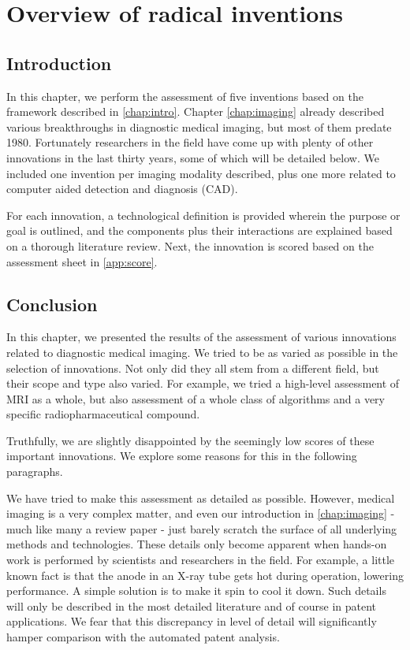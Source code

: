 \chapter{Overview of radical inventions}\label{chap:inventions}

\section{Introduction}
In this chapter, we perform the assessment of five inventions based on the
framework described in \autoref{chap:intro}. Chapter \ref{chap:imaging}
already described various breakthroughs in diagnostic medical imaging, but most of them
predate 1980. Fortunately researchers in the field have come up with plenty of
other innovations in the last thirty years, some of which will be detailed
below. We included one invention per imaging modality described, plus one more
related to computer aided detection and diagnosis (CAD).

For each innovation, a technological definition is provided wherein the purpose
or goal is outlined, and the components plus their interactions are explained
based on a thorough literature review. Next, the innovation is scored based on
the assessment sheet in \autoref{app:score}.











\section{Conclusion}
In this chapter, we presented the results of the assessment of various
innovations related to diagnostic medical imaging. We tried to be as varied as
possible in the selection of innovations. Not only did they all stem from a
different field, but their scope and type also varied. For example, we tried a
high-level assessment of MRI as a whole, but also assessment of a whole class of
algorithms and a very specific radiopharmaceutical compound.

Truthfully, we are slightly disappointed by the seemingly low scores of these
important innovations. We explore some reasons for this in the following
paragraphs.

We have tried to make this assessment as detailed as possible. However, medical
imaging is a very complex matter, and even our introduction in
\autoref{chap:imaging} - much like many a review paper - just barely scratch the
surface of all underlying methods and technologies. These details only become
apparent when hands-on work is performed by scientists and researchers in the
field. For example, a little known fact is that the anode in an X-ray tube gets
hot during operation, lowering performance. A simple solution is to make it spin
to cool it down. Such details will only be described in the most detailed
literature and of course in patent applications. We fear that this discrepancy
in level of detail will significantly hamper comparison with the automated
patent analysis.

